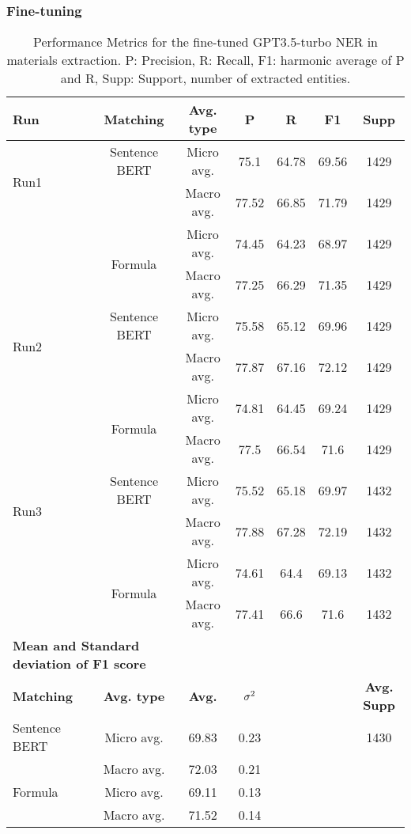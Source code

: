 \clearpage
\subsubsection{Fine-tuning}

\begin{table}[htbp]
\small
  \centering
  \caption{Performance Metrics for the fine-tuned GPT3.5-turbo NER in materials extraction. P: Precision, R: Recall, F1: harmonic average of P and R, Supp: Support, number of extracted entities.}
  \begin{tabular}{lcccccc}
    \toprule
    \textbf{Run} & \textbf{Matching} & \textbf{Avg. type} & \textbf{P} & \textbf{R} & \textbf{F1} & \textbf{Supp} \\
    \midrule
    \multirow{2}{*}{Run1} & Sentence BERT & Micro avg. & 75.1 & 64.78 & 69.56 & 1429 \\
    & & Macro avg. & 77.52 & 66.85 & 71.79 & 1429 \\
    \cmidrule{2-7}
    & \multirow{2}{*}{Formula} & Micro avg. & 74.45 & 64.23 & 68.97 & 1429 \\
    & & Macro avg. & 77.25 & 66.29 & 71.35 & 1429 \\
    \midrule
    \multirow{2}{*}{Run2} & Sentence BERT & Micro avg. & 75.58 & 65.12 & 69.96 & 1429 \\
    & & Macro avg. & 77.87 & 67.16 & 72.12 & 1429 \\
    \cmidrule{2-7}
    & \multirow{2}{*}{Formula} & Micro avg. & 74.81 & 64.45 & 69.24 & 1429 \\
    & & Macro avg. & 77.5 & 66.54 & 71.6 & 1429 \\
    \midrule
    \multirow{2}{*}{Run3} & Sentence BERT & Micro avg. & 75.52 & 65.18 & 69.97 & 1432 \\
    & & Macro avg. & 77.88 & 67.28 & 72.19 & 1432 \\
    \cmidrule{2-7}
    & \multirow{2}{*}{Formula} & Micro avg. & 74.61 & 64.4 & 69.13 & 1432 \\
    & & Macro avg. & 77.41 & 66.6 & 71.6 & 1432 \\
    \midrule
    \multicolumn{2}{l}{\textbf{Mean and Standard deviation of F1 score}} & & & & & \\
    \midrule
    \textbf{Matching} & \textbf{Avg. type} & \textbf{Avg.} & $\sigma\textsuperscript{2}$ & & & \textbf{Avg. Supp}\\
    Sentence BERT & Micro avg. & 69.83 & 0.23 & & & 1430 \\
    & Macro avg. & 72.03 & 0.21 & & & \\
    Formula & Micro avg. & 69.11 & 0.13 & & & \\
    & Macro avg. & 71.52 & 0.14 & & & \\
    \bottomrule
  \end{tabular}
\end{table}


